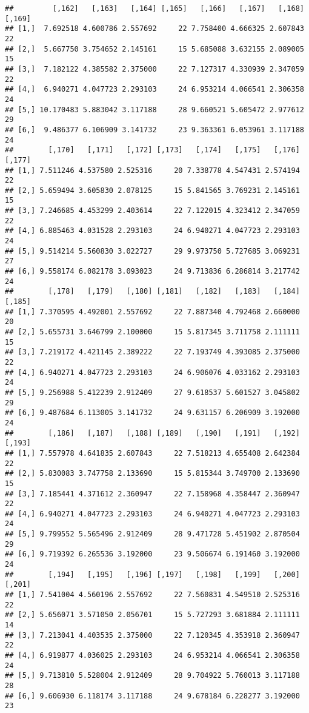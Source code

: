 \documentclass[]{article}
\begin{document}
\begin{verbatim}
##         [,162]   [,163]   [,164] [,165]   [,166]   [,167]   [,168] [,169]
## [1,]  7.692518 4.600786 2.557692     22 7.758400 4.666325 2.607843     22
## [2,]  5.667750 3.754652 2.145161     15 5.685088 3.632155 2.089005     15
## [3,]  7.182122 4.385582 2.375000     22 7.127317 4.330939 2.347059     22
## [4,]  6.940271 4.047723 2.293103     24 6.953214 4.066541 2.306358     24
## [5,] 10.170483 5.883042 3.117188     28 9.660521 5.605472 2.977612     29
## [6,]  9.486377 6.106909 3.141732     23 9.363361 6.053961 3.117188     24
##        [,170]   [,171]   [,172] [,173]   [,174]   [,175]   [,176] [,177]
## [1,] 7.511246 4.537580 2.525316     20 7.338778 4.547431 2.574194     22
## [2,] 5.659494 3.605830 2.078125     15 5.841565 3.769231 2.145161     15
## [3,] 7.246685 4.453299 2.403614     22 7.122015 4.323412 2.347059     22
## [4,] 6.885463 4.031528 2.293103     24 6.940271 4.047723 2.293103     24
## [5,] 9.514214 5.560830 3.022727     29 9.973750 5.727685 3.069231     27
## [6,] 9.558174 6.082178 3.093023     24 9.713836 6.286814 3.217742     24
##        [,178]   [,179]   [,180] [,181]   [,182]   [,183]   [,184] [,185]
## [1,] 7.370595 4.492001 2.557692     22 7.887340 4.792468 2.660000     20
## [2,] 5.655731 3.646799 2.100000     15 5.817345 3.711758 2.111111     15
## [3,] 7.219172 4.421145 2.389222     22 7.193749 4.393085 2.375000     22
## [4,] 6.940271 4.047723 2.293103     24 6.906076 4.033162 2.293103     24
## [5,] 9.256988 5.412239 2.912409     27 9.618537 5.601527 3.045802     29
## [6,] 9.487684 6.113005 3.141732     24 9.631157 6.206909 3.192000     24
##        [,186]   [,187]   [,188] [,189]   [,190]   [,191]   [,192] [,193]
## [1,] 7.557978 4.641835 2.607843     22 7.518213 4.655408 2.642384     22
## [2,] 5.830083 3.747758 2.133690     15 5.815344 3.749700 2.133690     15
## [3,] 7.185441 4.371612 2.360947     22 7.158968 4.358447 2.360947     22
## [4,] 6.940271 4.047723 2.293103     24 6.940271 4.047723 2.293103     24
## [5,] 9.799552 5.565496 2.912409     28 9.471728 5.451902 2.870504     29
## [6,] 9.719392 6.265536 3.192000     23 9.506674 6.191460 3.192000     24
##        [,194]   [,195]   [,196] [,197]   [,198]   [,199]   [,200] [,201]
## [1,] 7.541004 4.560196 2.557692     22 7.560831 4.549510 2.525316     22
## [2,] 5.656071 3.571050 2.056701     15 5.727293 3.681884 2.111111     14
## [3,] 7.213041 4.403535 2.375000     22 7.120345 4.353918 2.360947     22
## [4,] 6.919877 4.036025 2.293103     24 6.953214 4.066541 2.306358     24
## [5,] 9.713810 5.528004 2.912409     28 9.704922 5.760013 3.117188     28
## [6,] 9.606930 6.118174 3.117188     24 9.678184 6.228277 3.192000     23

\end{verbatim}
\end{document}
